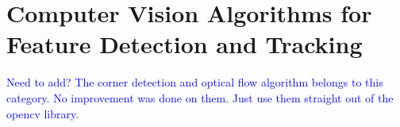 \section{Computer Vision Algorithms for Feature Detection and
  Tracking}
\textcolor{blue}{Need to add? The corner detection and optical flow
  algorithm belongs to this category. No improvement was done on them.
Just use them straight out of the opencv library. }




